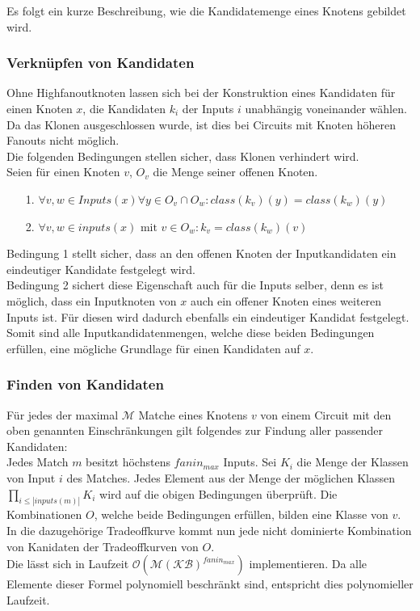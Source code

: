 \documentclass[11pt, a4paper, german]{article}
\begin{document}
Es folgt ein kurze Beschreibung, wie die Kandidatemenge eines Knotens gebildet wird.

\subsubsection{Verknüpfen von Kandidaten}
\label{subsubsec:verknuepfen_kandidaten}
Ohne Highfanoutknoten lassen sich bei der Konstruktion eines Kandidaten für einen Knoten $x$, die Kandidaten $k_i$ der Inputs $i$ unabhängig voneinander wählen.
Da das Klonen ausgeschlossen wurde, ist dies bei Circuits mit Knoten höheren Fanouts nicht möglich.\\
Die folgenden Bedingungen stellen sicher, dass Klonen verhindert wird. \\
Seien für einen Knoten $v$, $O_v$ die Menge seiner offenen Knoten.
\begin{itemize}
	\item[1.] $\forall v,w \in Inputs(x) \forall y \in O_v \cap O_w : class(k_v)(y) = class(k_w)(y)$
	\item[2.] $\forall v,w \in inputs(x) \text{ mit } v \in O_w : k_v = class(k_w)(v)$
\end{itemize}
Bedingung 1 stellt sicher, dass an den offenen Knoten der Inputkandidaten ein eindeutiger Kandidate festgelegt wird.\\ Bedingung 2 sichert diese Eigenschaft auch für die Inputs selber, denn es ist möglich, dass ein Inputknoten von $x$ auch ein offener Knoten eines weiteren Inputs ist. Für diesen wird dadurch ebenfalls ein eindeutiger Kandidat festgelegt. \\
Somit sind alle Inputkandidatenmengen, welche diese beiden Bedingungen erfüllen, eine mögliche Grundlage für einen Kandidaten auf $x$. 

\subsubsection{Finden von Kandidaten} 
Für jedes der maximal $\mathcal{M}$ Matche eines Knotens $v$ von einem Circuit mit den oben genannten Einschränkungen gilt folgendes zur Findung aller passender Kandidaten:\\

Jedes Match $m$ besitzt höchstens $fanin_{max}$ Inputs. Sei $K_i$ die Menge der Klassen von Input $i$ des Matches. Jedes Element aus der Menge der möglichen Klassen $\prod_{i\leq |inputs(m)|} K_i $ wird auf die obigen Bedingungen überprüft. Die Kombinationen $O$, welche beide Bedingungen erfüllen, bilden eine Klasse von $v$. In die  dazugehörige Tradeoffkurve kommt nun jede nicht dominierte Kombination von Kanidaten der Tradeoffkurven von $O$. \\
Die lässt sich in Laufzeit $\mathcal{O}(\mathcal{M}(\mathcal{KB})^{fanin_{max}} )$ implementieren. Da alle Elemente dieser Formel polynomiell beschränkt sind, entspricht dies polynomieller Laufzeit.
 
\end{document}
